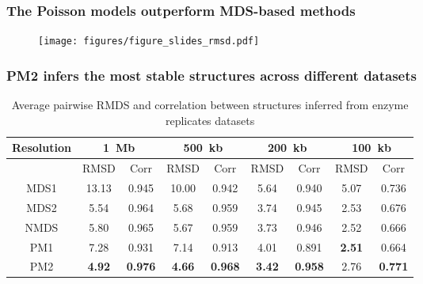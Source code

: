 \documentclass[xcolor=dvipsnames]{beamer}
\begin{document}

\begin{frame}
\frametitle{The Poisson models outperform MDS-based methods}
\begin{figure}
\texttt{[image: figures/figure\_slides\_rmsd.pdf]}
\end{figure}
\end{frame}

\begin{frame}
\frametitle{PM2 infers the most stable structures across different datasets}

{\scriptsize
\begin{table}
\begin{center}
\begin{tabular}{c | cc | cc | cc| cc}
\hline
Resolution & \multicolumn{2}{c}{1~Mb} & \multicolumn{2}{c}{500~kb} &
\multicolumn{2}{c}{200~kb} & \multicolumn{2}{c}{100~kb} \\
\hline
      &  RMSD & Corr  & RMSD  & Corr  & RMSD & Corr  & RMSD & Corr \\
\hline
MDS1  & 13.13 & 0.945 & 10.00 & 0.942 & 5.64 & 0.940 & 5.07 & 0.736 \\ 
MDS2  & 5.54  & 0.964 & 5.68  & 0.959 & 3.74 & 0.945 & 2.53 & 0.676 \\
NMDS  & 5.80  & 0.965 & 5.67  & 0.959 & 3.73 & 0.946 & 2.52 & 0.666 \\
PM1   & 7.28  & 0.931 & 7.14  & 0.913 & 4.01 & 0.891 & \textbf{2.51} & 0.664
\\
PM2   & \textbf{4.92} & \textbf{0.976} & \textbf{4.66} & \textbf{0.968} &
\textbf{3.42} & \textbf{0.958} & 2.76 & \textbf{0.771} \\
\hline
\end{tabular}
\end{center}
\caption{Average pairwise RMDS and correlation between structures inferred
from enzyme replicates datasets}
\end{table}
}
\end{frame}
\end{document}
